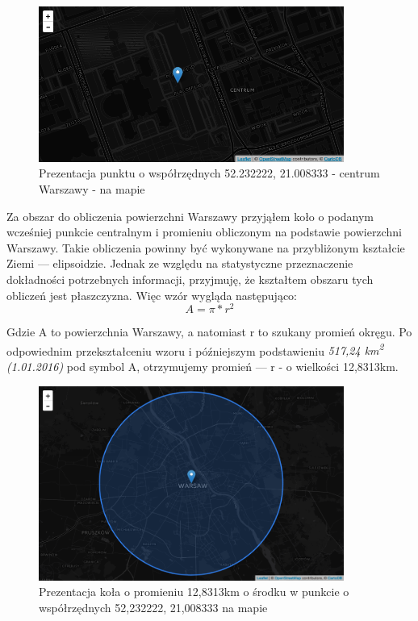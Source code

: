 \begin{figure}[h!]
  \centering
    \includegraphics[width=10cm]{images/warsaw-center}
  \caption{Prezentacja punktu o współrzędnych 52.232222, 21.008333 - centrum Warszawy - na mapie}
  \label{fig:warsawCenter}
\end{figure}


Za obszar do obliczenia powierzchni Warszawy przyjąłem koło o podanym wcześniej punkcie centralnym i promieniu obliczonym na podstawie powierzchni Warszawy\cite{WarszawaWiki}. Takie obliczenia powinny być wykonywane na przybliżonym kształcie Ziemi — elipsoidzie. Jednak ze względu na statystyczne przeznaczenie dokładności potrzebnych informacji, przyjmuję, że kształtem obszaru tych obliczeń jest płaszczyzna. Więc wzór wygląda następująco:
\[ A=\pi*r^2 \]

Gdzie A to powierzchnia Warszawy, a natomiast r to szukany promień okręgu. Po odpowiednim przekształceniu wzoru i późniejszym podstawieniu \textit{517,24 km\textsuperscript{2} (1.01.2016)}\cite{WarszawaWiki} pod symbol A, otrzymujemy promień — r - o wielkości 12,8313km.


\begin{figure}[h!]
  \centering
    \includegraphics[width=10cm]{images/warsaw-10km-radius}
  \caption{Prezentacja koła o promieniu 12,8313km o środku w punkcie o współrzędnych 52,232222, 21,008333 na mapie}
  \label{fig:warsaw10kmRadius}
\end{figure}

